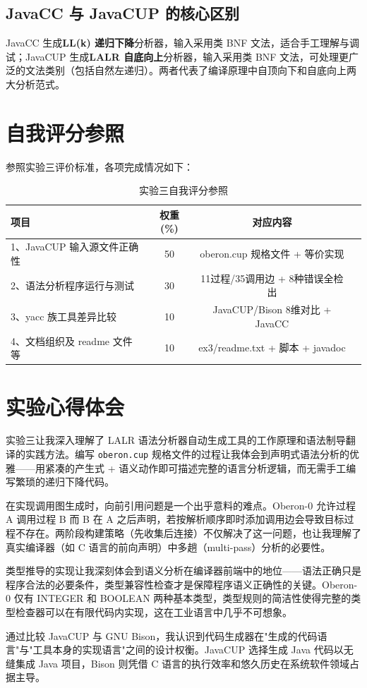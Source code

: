 \subsection{JavaCC 与 JavaCUP 的核心区别}

JavaCC 生成\textbf{LL(k) 递归下降}分析器，输入采用类 BNF 文法，适合手工理解与调试；JavaCUP 生成\textbf{LALR 自底向上}分析器，输入采用类 BNF 文法，可处理更广泛的文法类别（包括自然左递归）。两者代表了编译原理中自顶向下和自底向上两大分析范式。

\section{自我评分参照}

参照实验三评价标准，各项完成情况如下：

\begin{table}[htbp]
    \centering
    \begin{tabular}{|p{4.5cm}|c|c|p{4.5cm}|}
    \hline
    \textbf{项目} & \textbf{权重(\%)} & \textbf{对应内容} \\
    \hline
    1、JavaCUP 输入源文件正确性 & 50 & oberon.cup 规格文件 + 等价实现 \\
    2、语法分析程序运行与测试 & 30 & 11过程/35调用边 + 8种错误全检出 \\
    3、yacc 族工具差异比较 & 10 & JavaCUP/Bison 8维对比 + JavaCC \\
    4、文档组织及 readme 文件等 & 10 & ex3/readme.txt + 脚本 + javadoc \\
    \hline
    \end{tabular}
    \caption{实验三自我评分参照}
    \label{tab:self-eval-ex3}
\end{table}

\section{实验心得体会}

实验三让我深入理解了 LALR 语法分析器自动生成工具的工作原理和语法制导翻译的实践方法。编写 \texttt{oberon.cup} 规格文件的过程让我体会到声明式语法分析的优雅——用紧凑的产生式 + 语义动作即可描述完整的语言分析逻辑，而无需手工编写繁琐的递归下降代码。

在实现调用图生成时，向前引用问题是一个出乎意料的难点。Oberon-0 允许过程 A 调用过程 B 而 B 在 A 之后声明，若按解析顺序即时添加调用边会导致目标过程不存在。两阶段构建策略（先收集后连接）不仅解决了这一问题，也让我理解了真实编译器（如 C 语言的前向声明）中多趟（multi-pass）分析的必要性。

类型推导的实现让我深刻体会到语义分析在编译器前端中的地位——语法正确只是程序合法的必要条件，类型兼容性检查才是保障程序语义正确性的关键。Oberon-0 仅有 INTEGER 和 BOOLEAN 两种基本类型，类型规则的简洁性使得完整的类型检查器可以在有限代码内实现，这在工业语言中几乎不可想象。

通过比较 JavaCUP 与 GNU Bison，我认识到代码生成器在"生成的代码语言"与"工具本身的实现语言"之间的设计权衡。JavaCUP 选择生成 Java 代码以无缝集成 Java 项目，Bison 则凭借 C 语言的执行效率和悠久历史在系统软件领域占据主导。
